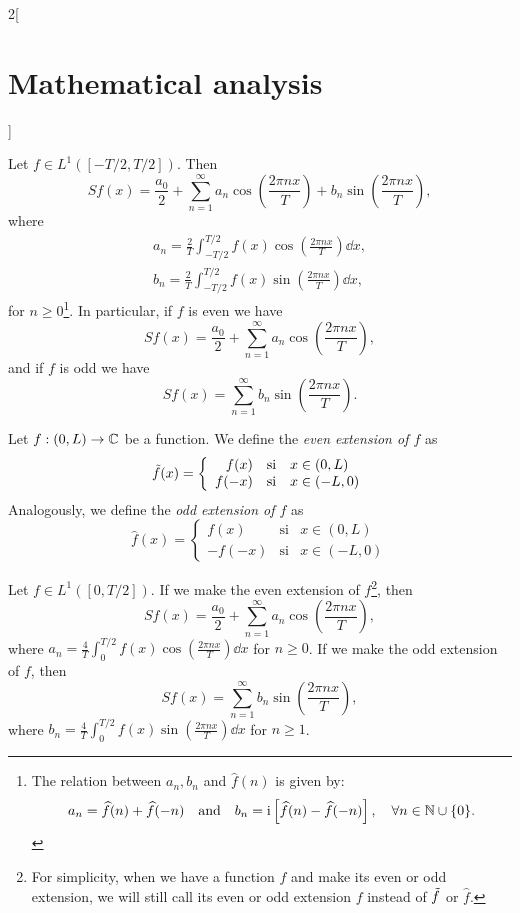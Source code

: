 \documentclass[../../../main.tex]{subfiles}
\begin{document}
\begin{multicols}{2}[\section{Mathematical analysis}]
\begin{prop}
Let $f\in L^1([-T/2,T/2])$. Then $$Sf(x)=\frac{a_0}{2}+\sum_{n=1}^\infty a_n\cos\left(\frac{2\pi nx}{T}\right)+b_n\sin\left(\frac{2\pi nx}{T}\right),$$ where \begin{gather*}
    a_n=\frac{2}{T}\int_{-T/2}^{T/2}f(x)\cos\left(\frac{2\pi nx}{T}\right)\dd x,\\ b_n=\frac{2}{T}\int_{-T/2}^{T/2}f(x)\sin\left(\frac{2\pi nx}{T}\right)\dd x,
\end{gather*} for $n\geq 0$\footnote{The relation between $a_n,b_n$ and $\widehat{f}(n)$ is given by: $$a_n=\widehat{f}(n)+\widehat{f}(-n)\quad\text{and}\quad b_n=\mathrm{i}\left[\widehat{f}(n)-\widehat{f}(-n)\right],\quad\forall n\in\mathbb{N} \cup\{0\}.$$}. In particular, if $f$ is even we have $$Sf(x)=\frac{a_0}{2}+\sum_{n=1}^\infty a_n\cos\left(\frac{2\pi nx}{T}\right),$$ and if $f$ is odd we have $$Sf(x)=\sum_{n=1}^\infty b_n\sin\left(\frac{2\pi nx}{T}\right).$$ 
\end{prop}
\begin{definition}
Let $f:(0,L)\rightarrow\mathbb{C} $ be a function. We define the \textit{even extension of $f$} as $$\Tilde{f}(x)=\left\{
    \begin{array}{rcl}
    f(x) & \text{si} & x\in(0,L) \\
    f(-x) & \text{si} & x\in(-L,0)
    \end{array}\right.$$ Analogously, we define the \textit{odd extension of $f$} as $$\hat{f}(x)=\left\{
    \begin{array}{rcl}
    f(x) & \text{si} & x\in(0,L) \\
    -f(-x) & \text{si} & x\in(-L,0)
    \end{array}\right.$$
\end{definition}
\begin{prop}
Let $f\in L^1([0,T/2])$. If we make the even extension of $f$\footnote{For simplicity, when we have a function $f$ and make its even or odd extension, we will still call its even or odd extension $f$ instead of $\Tilde{f}$ or $\hat{f}$.}, then $$Sf(x)=\frac{a_0}{2}+\sum_{n=1}^\infty a_n\cos\left(\frac{2\pi nx}{T}\right),$$ where $\displaystyle a_n=\frac{4}{T}\int_0^{T/2}f(x)\cos\left(\frac{2\pi nx}{T}\right)\dd x$ for $n\geq 0$. If we make the odd extension of $f$, then $$Sf(x)=\sum_{n=1}^\infty b_n\sin\left(\frac{2\pi nx}{T}\right),$$ where $\displaystyle b_n=\frac{4}{T}\int_0^{T/2}f(x)\sin\left(\frac{2\pi nx}{T}\right)\dd x$ for $n\geq 1$.
\end{prop}

\end{multicols}
\end{document}
